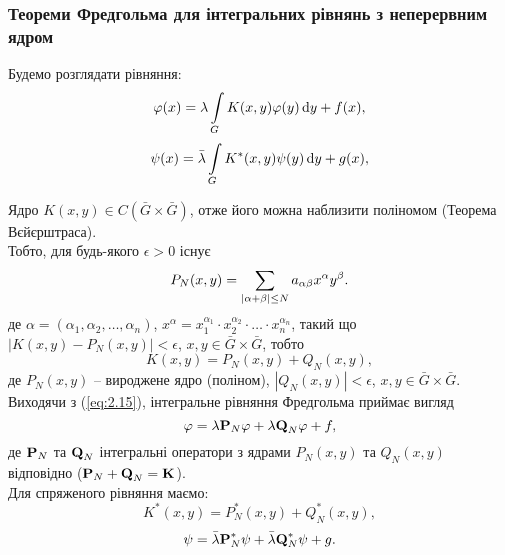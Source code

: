 \subsubsection{Теореми Фредгольма для інтегральних рівнянь з неперервним ядром}

Будемо розглядати рівняння:
\begin{equation}
	\label{eq:2.2}
	\phi(x) = \lambda \Int_G K(x, y) \phi(y) \diff y + f(x),
\end{equation}
\begin{equation}
	\label{eq:2.2'}
	\psi(x) = \bar \lambda \Int_G K^*(x, y) \psi(y) \diff y + g(x),
\end{equation}

Ядро $K(x, y) \in C(\bar G \times \bar G)$, отже його можна наблизити поліномом (Теорема Вєйєрштраса). \\

Тобто, для будь-якого $\epsilon > 0$ існує 
\begin{equation}
	P_N(x, y) = \Sum_{|\alpha + \beta| \le N} a_{\alpha\beta}x^\alpha y^\beta.
\end{equation}
де $\alpha = (\alpha_1, \alpha_2, \ldots, \alpha_n)$, $x^\alpha = x_1^{\alpha_1} \cdot x_2^{\alpha_2} \cdot \ldots \cdot x_n^{\alpha_n}$, такий що $|K(x, y) - P_N(x, y)| < \epsilon$, $x, y \in \bar G \times \bar G$, тобто 
\begin{equation}
	\label{eq:2.15}
	K(x, y) = P_N(x, y) + Q_N(x, y),
\end{equation}
де $P_N(x,y)$ -- вироджене ядро (поліном), $|Q_N(x, y)| < \epsilon$, $x, y \in \bar G \times \bar G$. \\

Виходячи з (\ref{eq:2.15}), інтегральне рівняння Фредгольма приймає вигляд 
\begin{equation}
	\label{eq:2.16}
	\phi = \lambda \bf{P}_N \phi + \lambda \bf{Q}_N \phi + f,
\end{equation}
де $\bf{P}_N$ та $\bf{Q}_N$ інтегральні оператори з ядрами $P_N(x, y)$ та $Q_N(x, y)$ відповідно ($\bf{P}_N + \bf{Q}_N = \bf{K}$). \\

Для спряженого рівняння маємо:
\begin{equation}
	\label{eq:2.15'}
	K^*(x, y) = P_N^*(x, y) + Q_N^*(x, y),
\end{equation}
\begin{equation}
	\label{eq:2.16'}
	\psi = \bar \lambda \bf{P}_N^* \psi + \bar \lambda \bf{Q}_N^* \psi + g.
\end{equation}


